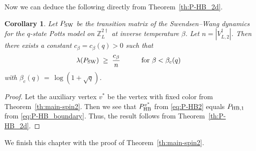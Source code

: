 \documentclass{dis}
\newtheorem{corollary}[theorem]{Corollary}
\theoremstyle{citing}
\begin{document}
Now we can deduce the following directly from Theorem~\ref{th:P-HB_2d}.
\begin{corollary}\label{coro:P-SW_2d_boundary}
Let ${P_{\rm SW}}$ be the transition matrix of the Swendsen--Wang dynamics for 
the $q$-state Potts model on ${\ensuremath{\mathbb{Z}}}_L^{2\dag}$ at inverse temperature 
$\beta$. 
Let $n=|V^\dag_{L,2}|$. Then there exists a constant 
$c_\beta=c_\beta(q)>0$ 
such that
\[
\lambda({P_{\rm SW}}) \;\ge\; \frac{c_\beta}{n} \qquad\;\;\, 
	\text{ for } \beta < \beta_c(q) 
\]
with $\beta_c(q)\,=\,\log(1+\sqrt{q})$. 
\end{corollary}

\begin{proof}
Let the auxiliary vertex $v^*$ be the vertex with fixed color 
from Theorem~\ref{th:main-spin2}. Then we see that 
$P_{{\rm HB}}^{v^*}$ from \eqref{eq:P-HB2} equals 
$P_{{\rm HB},1}$ from \eqref{eq:P-HB_boundary}.
Thus, the result follows from Theorem~\ref{th:P-HB_2d}.
\end{proof}

We finish this chapter with the proof of Theorem~\ref{th:main-spin2}.
\end{document}
